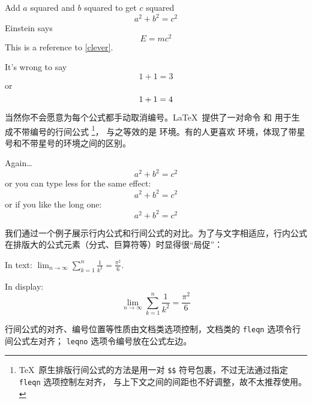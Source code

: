 \begin{example}
Add $a$ squared and $b$ squared
to get $c$ squared
\begin{equation}
a^2 + b^2 = c^2
\end{equation}
Einstein says
\begin{equation}
E = mc^2 \label{clever}
\end{equation}
This is a reference to
\eqref{clever}.
\end{example}

\begin{example}
It's wrong to say
\begin{equation}
1 + 1 = 3 \tag{dumb}
\end{equation}
or
\begin{equation}
1 + 1 = 4 \notag
\end{equation}
\end{example}

\cmdindex{[,]}
当然你不会愿意为每个公式都手动取消编号。\LaTeX\ 提供了一对命令 \cmd{[} 和 \cmd{]} 用于生成不带编号的行间公式%
\footnote{\TeX\ 原生排版行间公式的方法是用一对 \texttt{\$\$} 符号包裹，不过无法通过指定 \texttt{fleqn} 选项控制左对齐，
与上下文之间的间距也不好调整，故不太推荐使用。}，
与之等效的是  环境。有的人更喜欢  环境，体现了带星号和不带星号的环境之间的区别。

\begin{example}
Again\ldots
\begin{equation*}
a^2 + b^2 = c^2
\end{equation*}
or you can type less for the
same effect:
\[ a^2 + b^2 = c^2 \]
or if you like the long one:
\begin{displaymath}
a^2 + b^2 = c^2
\end{displaymath}
\end{example}

我们通过一个例子展示行内公式和行间公式的对比。为了与文字相适应，行内公式在排版大的公式元素（分式、巨算符等）时显得很“局促”：

\begin{example}
In text:
$\lim_{n \to \infty}
\sum_{k=1}^n \frac{1}{k^2}
= \frac{\pi^2}{6}$.

In display:
\[
\lim_{n \to \infty}
\sum_{k=1}^n \frac{1}{k^2}
= \frac{\pi^2}{6}
\]
\end{example}

行间公式的对齐、编号位置等性质由文档类选项控制，文档类的 \texttt{fleqn} 选项令行间公式左对齐；
\texttt{leqno} 选项令编号放在公式左边。

